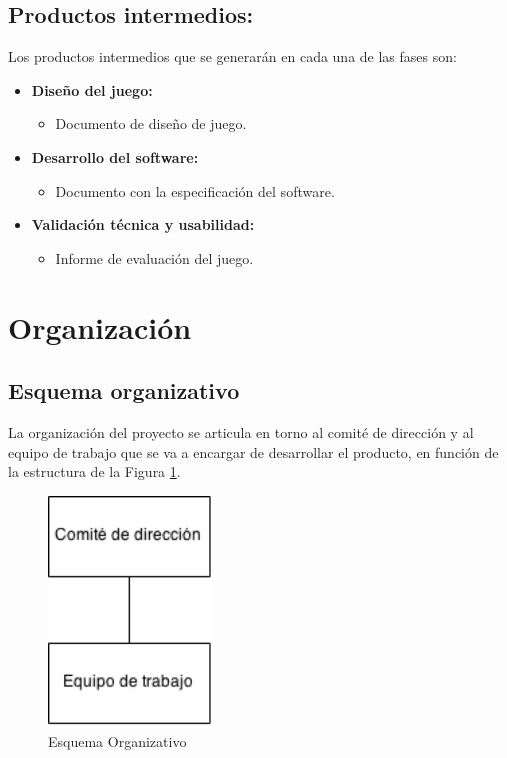 		\subsection{Productos intermedios:}

			Los productos intermedios que se generarán en cada una de las fases son:

			\begin{itemize}
				\item \textbf{Diseño del juego:}
				\begin{itemize}
					\item Documento de diseño de juego.
				\end{itemize}
				\item \textbf{Desarrollo del software:}
				\begin{itemize}
					\item Documento con la especificación del software.
				\end{itemize}
				\item \textbf{Validación técnica y usabilidad:}
				\begin{itemize}
					\item Informe de evaluación del juego.
				\end{itemize}
			\end{itemize}

	\section{Organización}

		\subsection{Esquema organizativo}

			La organización del proyecto se articula en torno al comité de dirección y al equipo de trabajo que se va a encargar de desarrollar el producto, en función de la estructura de la Figura \ref{fig:esqOrg}.

			\begin{figure}[!htp]
				\centering
				\includegraphics[scale=.75]{fig/esq}
				\caption{Esquema Organizativo}
				\label{fig:esqOrg}
			\end{figure}

